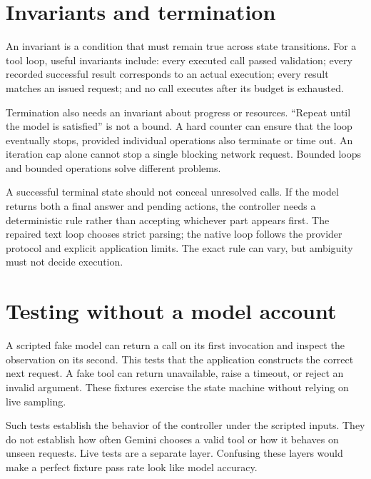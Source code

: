 \section{Invariants and termination}
An invariant is a condition that must remain true across state transitions. For a tool loop, useful invariants include: every executed call passed validation; every recorded successful result corresponds to an actual execution; every result matches an issued request; and no call executes after its budget is exhausted.

Termination also needs an invariant about progress or resources. “Repeat until the model is satisfied” is not a bound. A hard counter can ensure that the loop eventually stops, provided individual operations also terminate or time out. An iteration cap alone cannot stop a single blocking network request. Bounded loops and bounded operations solve different problems.

A successful terminal state should not conceal unresolved calls. If the model returns both a final answer and pending actions, the controller needs a deterministic rule rather than accepting whichever part appears first. The repaired text loop chooses strict parsing; the native loop follows the provider protocol and explicit application limits. The exact rule can vary, but ambiguity must not decide execution.

\section{Testing without a model account}
A scripted fake model can return a call on its first invocation and inspect the observation on its second. This tests that the application constructs the correct next request. A fake tool can return unavailable, raise a timeout, or reject an invalid argument. These fixtures exercise the state machine without relying on live sampling.

Such tests establish the behavior of the controller under the scripted inputs. They do not establish how often Gemini chooses a valid tool or how it behaves on unseen requests. Live tests are a separate layer. Confusing these layers would make a perfect fixture pass rate look like model accuracy.

